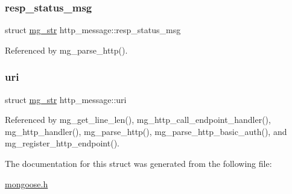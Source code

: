 \mbox{\label{structhttp__message_ae819bf6100f781e15515c01bf03f5a76_ae819bf6100f781e15515c01bf03f5a76}} 
\subsubsection{\texorpdfstring{resp\+\_\+status\+\_\+msg}{resp\_status\_msg}}
{\footnotesize\ttfamily struct \hyperlink{structmg__str}{mg\+\_\+str} http\+\_\+message\+::resp\+\_\+status\+\_\+msg}



Referenced by mg\+\_\+parse\+\_\+http().

\mbox{\label{structhttp__message_a2f8d9e674965443571fd6e581393dd62_a2f8d9e674965443571fd6e581393dd62}} 
\subsubsection{\texorpdfstring{uri}{uri}}
{\footnotesize\ttfamily struct \hyperlink{structmg__str}{mg\+\_\+str} http\+\_\+message\+::uri}



Referenced by mg\+\_\+get\+\_\+line\+\_\+len(), mg\+\_\+http\+\_\+call\+\_\+endpoint\+\_\+handler(), mg\+\_\+http\+\_\+handler(), mg\+\_\+parse\+\_\+http(), mg\+\_\+parse\+\_\+http\+\_\+basic\+\_\+auth(), and mg\+\_\+register\+\_\+http\+\_\+endpoint().



The documentation for this struct was generated from the following file\+:\begin{DoxyCompactItemize}
\item 
\hyperlink{mongoose_8h}{mongoose.\+h}\end{DoxyCompactItemize}
